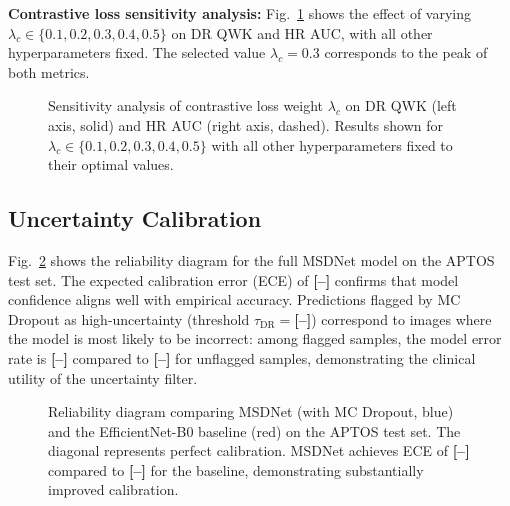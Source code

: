 \documentclass[review,12pt]{elsarticle}
\newcommand{\RESULT}[1]{\textbf{[--]}}
\begin{document}
\textbf{Contrastive loss sensitivity analysis:} Fig.~\ref{fig:sensitivity}
shows the effect of varying $\lambda_c \in \{0.1, 0.2, 0.3, 0.4, 0.5\}$ on
DR QWK and HR AUC, with all other hyperparameters fixed. The selected value
$\lambda_c = 0.3$ corresponds to the peak of both metrics.

\begin{figure}[htbp]
  \centering
  \caption{Sensitivity analysis of contrastive loss weight $\lambda_c$ on
  DR QWK (left axis, solid) and HR AUC (right axis, dashed). Results shown
  for $\lambda_c \in \{0.1, 0.2, 0.3, 0.4, 0.5\}$ with all other
  hyperparameters fixed to their optimal values.}
  \label{fig:sensitivity}
\end{figure}

\subsection{Uncertainty Calibration}

Fig.~\ref{fig:calibration} shows the reliability diagram for the full MSDNet
model on the APTOS test set. The expected calibration error (ECE) of
\RESULT{ece_aptos} confirms that model confidence aligns well with empirical
accuracy. Predictions flagged by MC Dropout as high-uncertainty (threshold
$\tau_{\text{DR}} = $\RESULT{tau_dr}) correspond to images where the model
is most likely to be incorrect: among flagged samples, the model error rate
is \RESULT{flagged_error_rate} compared to \RESULT{unflagged_error_rate} for
unflagged samples, demonstrating the clinical utility of the uncertainty filter.

\begin{figure}[htbp]
  \centering
  \caption{Reliability diagram comparing MSDNet (with MC Dropout, blue) and
  the EfficientNet-B0 baseline (red) on the APTOS test set. The diagonal
  represents perfect calibration. MSDNet achieves ECE of \RESULT{ece_aptos}
  compared to \RESULT{ece_baseline} for the baseline, demonstrating substantially
  improved calibration.}
  \label{fig:calibration}
\end{figure}
\end{document}
